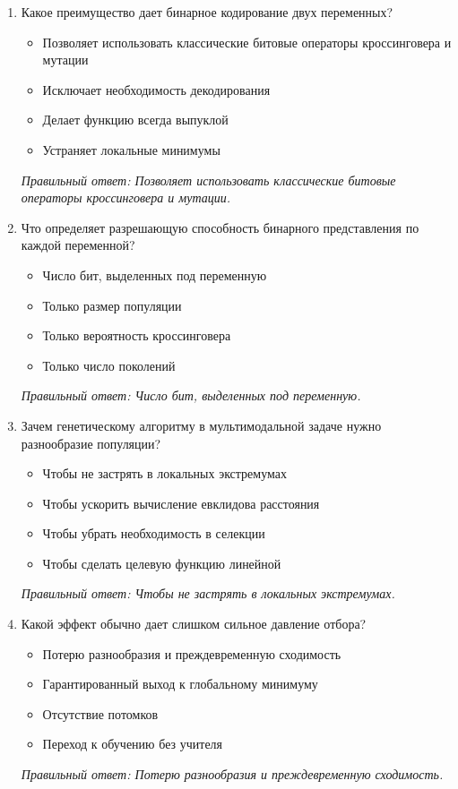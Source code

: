 \begin{enumerate}[label=\textbf{\arabic*.}, leftmargin=0pt, itemsep=1.2em]
\item Какое преимущество дает бинарное кодирование двух переменных?
\begin{itemize}[label=$\square$, leftmargin=1.5cm, itemsep=0.2em, topsep=0.3em]
\item Позволяет использовать классические битовые операторы кроссинговера и мутации
\item Исключает необходимость декодирования
\item Делает функцию всегда выпуклой
\item Устраняет локальные минимумы
\end{itemize}
{\small\textit{Правильный ответ: Позволяет использовать классические битовые операторы кроссинговера и мутации.}}

\item Что определяет разрешающую способность бинарного представления по каждой переменной?
\begin{itemize}[label=$\square$, leftmargin=1.5cm, itemsep=0.2em, topsep=0.3em]
\item Число бит, выделенных под переменную
\item Только размер популяции
\item Только вероятность кроссинговера
\item Только число поколений
\end{itemize}
{\small\textit{Правильный ответ: Число бит, выделенных под переменную.}}

\item Зачем генетическому алгоритму в мультимодальной задаче нужно разнообразие популяции?
\begin{itemize}[label=$\square$, leftmargin=1.5cm, itemsep=0.2em, topsep=0.3em]
\item Чтобы не застрять в локальных экстремумах
\item Чтобы ускорить вычисление евклидова расстояния
\item Чтобы убрать необходимость в селекции
\item Чтобы сделать целевую функцию линейной
\end{itemize}
{\small\textit{Правильный ответ: Чтобы не застрять в локальных экстремумах.}}

\item Какой эффект обычно дает слишком сильное давление отбора?
\begin{itemize}[label=$\square$, leftmargin=1.5cm, itemsep=0.2em, topsep=0.3em]
\item Потерю разнообразия и преждевременную сходимость
\item Гарантированный выход к глобальному минимуму
\item Отсутствие потомков
\item Переход к обучению без учителя
\end{itemize}
{\small\textit{Правильный ответ: Потерю разнообразия и преждевременную сходимость.}}


\end{enumerate}
